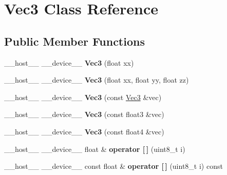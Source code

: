 \hypertarget{class_vec3}{}\section{Vec3 Class Reference}
\label{class_vec3}
\subsection*{Public Member Functions}
\begin{DoxyCompactItemize}
\item 
\+\_\+\+\_\+host\+\_\+\+\_\+ \+\_\+\+\_\+device\+\_\+\+\_\+ {\bfseries Vec3} (float xx)\hypertarget{class_vec3_ab76e7b1dfb13878ef79e295bb4e7444b}{}\label{class_vec3_ab76e7b1dfb13878ef79e295bb4e7444b}

\item 
\+\_\+\+\_\+host\+\_\+\+\_\+ \+\_\+\+\_\+device\+\_\+\+\_\+ {\bfseries Vec3} (float xx, float yy, float zz)\hypertarget{class_vec3_a7d4737059c28fa7c8c3db22ba4718178}{}\label{class_vec3_a7d4737059c28fa7c8c3db22ba4718178}

\item 
\+\_\+\+\_\+host\+\_\+\+\_\+ \+\_\+\+\_\+device\+\_\+\+\_\+ {\bfseries Vec3} (const \hyperlink{class_vec3}{Vec3} \&vec)\hypertarget{class_vec3_a3b08c22982decc110fb443cad3bc7eac}{}\label{class_vec3_a3b08c22982decc110fb443cad3bc7eac}

\item 
\+\_\+\+\_\+host\+\_\+\+\_\+ \+\_\+\+\_\+device\+\_\+\+\_\+ {\bfseries Vec3} (const float3 \&vec)\hypertarget{class_vec3_a2edb8ba8713360b31ef22fa301681003}{}\label{class_vec3_a2edb8ba8713360b31ef22fa301681003}

\item 
\+\_\+\+\_\+host\+\_\+\+\_\+ \+\_\+\+\_\+device\+\_\+\+\_\+ {\bfseries Vec3} (const float4 \&vec)\hypertarget{class_vec3_aee1b03c9e5b951fb7b5b9171db699057}{}\label{class_vec3_aee1b03c9e5b951fb7b5b9171db699057}

\item 
\+\_\+\+\_\+host\+\_\+\+\_\+ \+\_\+\+\_\+device\+\_\+\+\_\+ float \& {\bfseries operator \mbox{[}$\,$\mbox{]}} (uint8\+\_\+t i)\hypertarget{class_vec3_a13f7dfd7a5bcea529e57f1b7fd1a45f5}{}\label{class_vec3_a13f7dfd7a5bcea529e57f1b7fd1a45f5}

\item 
\+\_\+\+\_\+host\+\_\+\+\_\+ \+\_\+\+\_\+device\+\_\+\+\_\+ const float \& {\bfseries operator \mbox{[}$\,$\mbox{]}} (uint8\+\_\+t i) const\hypertarget{class_vec3_acb50b12a71971b8229a0e81352ef848f}{}\label{class_vec3_acb50b12a71971b8229a0e81352ef848f}


\end{DoxyCompactItemize}

